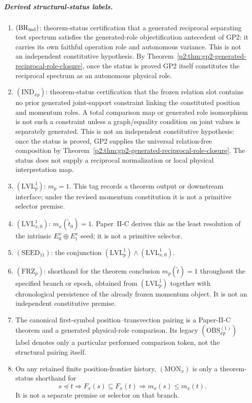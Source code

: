 \documentclass[12pt,a4paper]{article}
\begin{document}
\begin{definition}
\subparagraph{Derived structural-status labels.}
\begin{enumerate}[label=(\roman*),leftmargin=2em]
\item \((\mathrm{BR}_{\rm ind})\): theorem-status certification that a
generated reciprocal separating test spectrum satisfies the generated-role
objectification antecedent of GP2: it carries its own faithful operation role
and autonomous variance.  This is not an independent constitutive hypothesis.
By Theorem~\ref{p2:thm:gp2-generated-reciprocal-role-closure}, once the status
is proved GP2 itself constitutes the reciprocal spectrum as an autonomous
physical role.
\item \((\mathrm{IND}_{xp})\): theorem-status certification that the frozen
relation slot contains no prior generated joint-support constraint linking the
constituted position and momentum roles.  A total comparison map or generated
role isomorphism is not such a constraint unless a graph/equality condition on
joint values is separately generated.  This is not an independent
constitutive hypothesis: once the status is proved, GP2 supplies the universal
relation-free composition by
Theorem~\ref{p2:thm:gp2-generated-reciprocal-role-closure}.  The status does
not supply a reciprocal normalization or local physical interpretation map.
\item \((\mathrm{LVL}_p^1)\): \(m_p=1\).  This tag records a theorem output or
downstream interface; under the revised momentum constitution it is not a
primitive selector premise.
\item \((\mathrm{LVL}_{x,0}^1)\):
\(m_x(\widetilde t_0)=1\).  Paper~II-C derives this as the least resolution
of the intrinsic \(E_0^x\oplus E_1^x\) seed; it is not a primitive selector.
\item \((\mathrm{SEED}_{11})\): the conjunction
\((\mathrm{LVL}_p^1)\wedge(\mathrm{LVL}_{x,0}^1)\).
\item \((\mathrm{FRZ}_p)\): shorthand for the theorem conclusion
\(m_p(\widetilde t)=1\) throughout the specified branch or epoch, obtained
from \((\mathrm{LVL}_p^1)\) together with chronological persistence of the
already frozen momentum object.  It is not an independent constitutive
premise.
\item The canonical first-symbol position--transvection pairing is a
Paper-II-C theorem and a generated physical-role comparison.  Its legacy
\((\mathrm{OBS}^{(1)}_{xp})\) label denotes only a particular performed
comparison token, not the structural pairing itself.
\item On any retained finite position-frontier history,
\((\mathrm{MON}_x)\) is only a theorem-status shorthand for
\[
  s\preceq t\Longrightarrow F_x(s)\subseteq F_x(t)
  \Longrightarrow m_x(s)\le m_x(t).
\]
It is not a separate premise or selector on that branch.
\end{enumerate}


\end{definition}
\end{document}
